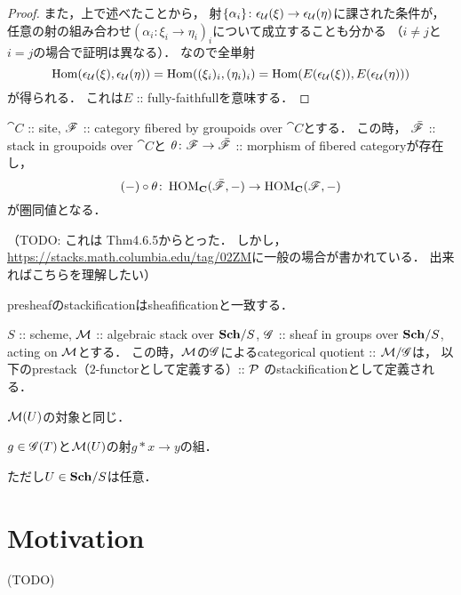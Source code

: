 \documentclass[a4paper]{jsarticle}
\newcommand{\HOM}{\operatorname{HOM}}
\begin{document}
\begin{proof}
    また，上で述べたことから，
    射$\{\alpha_i\} \colon \epsilon_{\mathcal{U}}(\xi) \to \epsilon_{\mathcal{U}}(\eta)$に課された条件が，
    任意の射の組み合わせ$(\alpha_i \colon \xi_i \to \eta_i)_i$について成立することも分かる
    （$i \neq j$と$i=j$の場合で証明は異なる）．
    なので全単射
    \[
        \operatorname{Hom}(\epsilon_{\mathcal{U}}(\xi), \epsilon_{\mathcal{U}}(\eta))
        =\operatorname{Hom}((\xi_i)_i, (\eta_i)_i)
        =\operatorname{Hom}(E(\epsilon_{\mathcal{U}}(\xi)), E(\epsilon_{\mathcal{U}}(\eta)))
    \]
    が得られる．
    これは$E$ :: fully-faithfullを意味する．
\end{proof}

\begin{Thm}
    $\cat{C}$ :: site,
    $\mathscr{F}$ :: category fibered by groupoids over $\cat{C}$とする．
    この時，
    $\bar{\mathscr{F}}$ :: stack in groupoids over $\cat{C}$と
    $\theta \colon \mathscr{F} \to \bar{\mathscr{F}}$ :: morphism of fibered categoryが存在し，
    \[ (-) \circ \theta \colon \HOM_{\cat{C}}(\bar{\fibF}, -) \to \HOM_{\cat{C}}(\fibF, -) \]
    が圏同値となる．
\end{Thm}
（TODO: これは\cite{ASS} Thm4.6.5からとった．
しかし，\url{https://stacks.math.columbia.edu/tag/02ZM}に一般の場合が書かれている．
出来ればこちらを理解したい）

\begin{Example}
    presheafのstackificationはsheafificationと一致する．
\end{Example}

\begin{Example}
    $S$ :: scheme,
    $\mathcal{M}$ :: algebraic stack over $\mathbf{Sch}/S$,
    $\mathscr{G}$ :: sheaf in groups over $\mathbf{Sch}/S$, acting on $\mathcal{M}$とする．
    この時，$\mathcal{M}$の$\mathscr{G}$によるcategorical quotient :: $\mathcal{M}/\mathscr{G}$は，
    以下のprestack（$2$-functorとして定義する）:: $\mathcal{P}$ のstackificationとして定義される．
    \begin{description}[labelindent=1cm]
        \item[Objects of $\shP(U)$.] $\mathcal{M}(U)$の対象と同じ．
        \item[Arrows of $\shP(U)$.]  $g \in \mathscr{G}(T)$と$\mathcal{M}(U)$の射$g \ast x \to y$の組．
    \end{description}
    ただし$U \in \mathbf{Sch}/S$は任意．
\end{Example}

\section{Motivation}
    (TODO)
\end{document}
